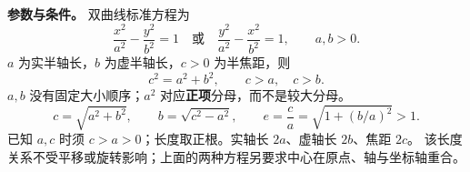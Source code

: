 \begin{statementbox}
\textbf{参数与条件。} 双曲线标准方程为
\[
\frac{x^2}{a^2}-\frac{y^2}{b^2}=1\quad\text{或}\quad
\frac{y^2}{a^2}-\frac{x^2}{b^2}=1,\qquad a,b>0.
\]
$a$ 为实半轴长，$b$ 为虚半轴长，$c>0$ 为半焦距，则
\[
\boxed{c^2=a^2+b^2},\qquad c>a,\quad c>b.
\]
$a,b$ 没有固定大小顺序；$a^2$ 对应\textbf{正项}分母，而不是较大分母。
\[
 c=\sqrt{a^2+b^2},\qquad b=\sqrt{c^2-a^2},\qquad
 e=\frac ca=\sqrt{1+(b/a)^2}>1.
\]
已知 $a,c$ 时须 $c>a>0$；长度取正根。实轴长 $2a$、虚轴长 $2b$、焦距 $2c$。
该长度关系不受平移或旋转影响；上面的两种方程另要求中心在原点、轴与坐标轴重合。
\end{statementbox}
